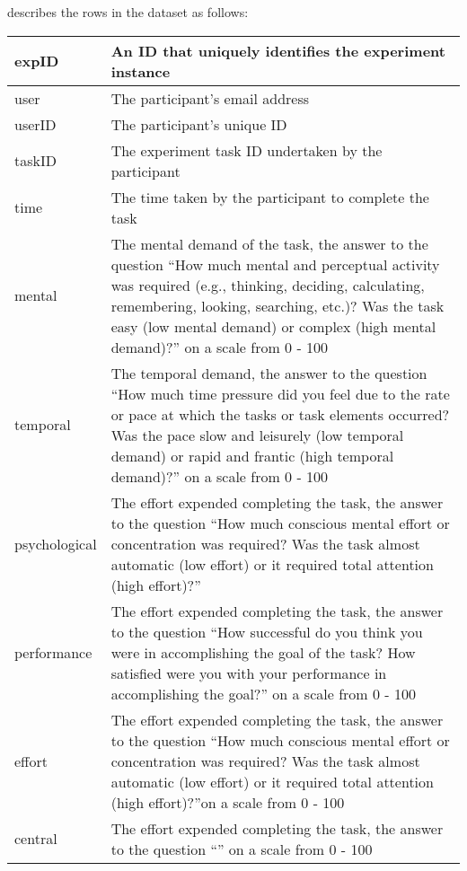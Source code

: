 \citep{longo2014formalising} describes the rows in the dataset as follows:

\begin{table}[]
\centering
\begin{tabular}{|l|p{8cm}|}

\\ \hline
 expID & An ID that uniquely identifies the experiment instance \\ \hline
 user & The participant's email address \\ \hline
 userID & The participant's unique ID \\ \hline
 taskID & The experiment task ID undertaken by the participant \\ \hline
 time & The time taken by the participant to complete the task \\ \hline
 mental & The mental demand of the task, the answer to the question ``How much mental and perceptual activity was required (e.g., thinking, deciding, calculating, remembering, looking, searching, etc.)? Was the task easy (low mental demand) or complex (high mental demand)?'' on a scale from 0 - 100 \\ \hline
 temporal & The temporal demand, the answer to the question ``How much time pressure did you feel due to the rate or pace at which the tasks or task elements occurred? Was the pace slow and leisurely (low temporal demand) or rapid and frantic (high temporal demand)?'' on a scale from 0 - 100\\ \hline
 psychological & The effort expended completing the task, the answer to the question ``How much conscious mental effort or concentration was required? Was the task almost automatic (low effort) or it required total attention (high effort)?'' \\ \hline
 performance & The effort expended completing the task, the answer to the question ``How successful do you think you were in accomplishing the goal of the task? How satisfied were you with your performance in accomplishing the goal?'' on a scale from 0 - 100 \\ \hline
 effort & The effort expended completing the task, the answer to the question ``How much conscious mental effort or concentration was required? Was the task almost automatic (low effort) or it required total attention (high effort)?''on a scale from 0 - 100 \\ \hline
 central & The effort expended completing the task, the answer to the question ``'' on a scale from 0 - 100 \\ \hline

\end{tabular}
\end{table}
